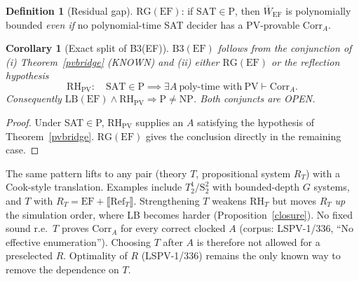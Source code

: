 \documentclass[11pt]{article}
\newtheorem{corollary}[theorem]{Corollary}
\theoremstyle{definition}
\newtheorem{definition}[theorem]{Definition}
\theoremstyle{remark}
\begin{document}
\begin{definition}[Residual gap]
$\mathrm{RG}(\mathrm{EF})$: if $\mathrm{SAT}\in\mathrm{P}$, then $\overline W_{\mathrm{EF}}$ is polynomially bounded \emph{even if} no polynomial-time SAT decider has a PV-provable $\mathrm{Corr}_A$.
\end{definition}

\begin{corollary}[Exact split of B3(EF)]\label{split}
$\mathrm{B3}(\mathrm{EF})$ follows from the conjunction of (i) Theorem~\ref{pvbridge} (KNOWN) and (ii) either $\mathrm{RG}(\mathrm{EF})$ or the reflection hypothesis
\[
\mathrm{RH}_{\mathrm{PV}}:\quad \mathrm{SAT}\in\mathrm{P}\implies \exists A\ \text{poly-time with}\ \mathrm{PV}\vdash \mathrm{Corr}_A .
\]
Consequently $\mathrm{LB}(\mathrm{EF})\wedge\mathrm{RH}_{\mathrm{PV}}\Rightarrow\mathrm{P}\ne\mathrm{NP}$. Both conjuncts are OPEN.
\end{corollary}
\begin{proof}
Under SAT$\in$P, $\mathrm{RH}_{\mathrm{PV}}$ supplies an $A$ satisfying the hypothesis of Theorem~\ref{pvbridge}. $\mathrm{RG}(\mathrm{EF})$ gives the conclusion directly in the remaining case.
\end{proof}
The same pattern lifts to any pair (theory $T$, propositional system $R_T$) with a Cook-style translation. Examples include $T^1_2/\mathrm{S}^2_2$ with bounded-depth $G$ systems, and $T$ with $R_T=\mathrm{EF}+\llbracket\mathrm{Ref}_T\rrbracket$. Strengthening $T$ weakens $\mathrm{RH}_T$ but moves $R_T$ \emph{up} the simulation order, where LB becomes harder (Proposition~\ref{closure}). No fixed sound r.e.\ $T$ proves $\mathrm{Corr}_A$ for every correct clocked $A$ (corpus: LSPV-1/336, ``No effective enumeration''). Choosing $T$ after $A$ is therefore not allowed for a preselected $R$. Optimality of $R$ (LSPV-1/336) remains the only known way to remove the dependence on $T$.
\end{document}
